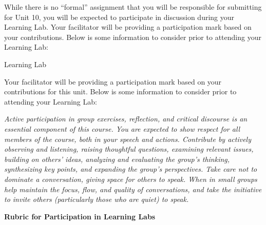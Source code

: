 \documentclass[
]{book}
\begin{document}
\begin{assessment}
While there is no ``formal'' assignment that you will be responsible for submitting for Unit 10, you will be expected to participate in discussion during your Learning Lab. Your facilitator will be providing a participation mark based on your contributions. Below is some information to consider prior to attending your Learning Lab:

{Learning Lab}

Your facilitator will be providing a participation mark based on your contributions for this unit. Below is some information to consider prior to attending your Learning Lab:

\emph{Active participation in group exercises, reflection, and critical discourse is an essential component of this course. You are expected to show respect for all members of the course, both in your speech and actions. Contribute by actively observing and listening, raising thoughtful questions, examining relevant issues, building on others' ideas, analyzing and evaluating the group's thinking, synthesizing key points, and expanding the group's perspectives. Take care not to dominate a conversation, giving space for others to speak. When in small groups help maintain the focus, flow, and quality of conversations, and take the initiative to invite others (particularly those who are quiet) to speak.}

\textbf{Rubric for Participation in Learning Labs}


\end{assessment}
\end{document}
